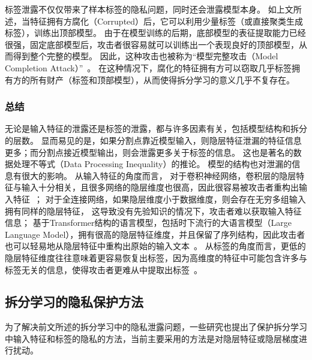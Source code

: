 标签泄露不仅仅带来了样本标签的隐私问题，同时还会泄露模型本身。
%
如上文所述，当特征拥有方腐化（Corrupted）后，它可以利用少量标签（或直接聚类生成标签），训练出顶部模型。
%
由于在模型训练的后期，底部模型的表征提取能力已经很强，固定底部模型后，攻击者很容易就可以训练出一个表现良好的顶部模型，从而得到整个完整的模型。
%
因此，这种攻击也被称为``模型完整攻击（Model Completion Attack）''~\cite{fucong2022label_infer_attack}。
%
在这种情况下，腐化的特征拥有方可以窃取几乎标签拥有方的所有财产（标签和顶部模型），从而使得拆分学习的意义几乎不复存在。


\subsubsection{总结}

无论是输入特征的泄露还是标签的泄露，都与许多因素有关，包括模型结构和拆分的层数。
%
显而易见的是，如果分割点靠近模型输入，则隐层特征泄漏的特征信息更多；而分割点接近模型输出，则会泄露更多关于标签的信息。
%
这也是著名的数据处理不等式（Data Processing Inequality）的推论。
%
模型的结构也对泄漏的信息有很大的影响。
%
从输入特征的角度而言，
%
对于卷积神经网络，卷积层的隐层特征与输入十分相关，且很多网络的隐层维度也很高，因此很容易被攻击者重构出输入特征~\cite{abuadbba2020can_split}；
%
对于全连接网络，如果隐层维度小于数据维度，则会存在无穷多组输入拥有同样的隐层特征，
这导致没有先验知识的情况下，攻击者难以获取输入特征信息；
%
基于Transformer结构的语言模型，包括时下流行的大语言模型（Large Language Model），拥有很高的隐层特征维度，并且保留了序列结构，因此攻击者也可以轻易地从隐层特征中重构出原始的输入文本~\cite{morris2023embedding_almost}。
%
从标签的角度而言，更低的隐层特征维度往往意味着更容易恢复出标签，因为高维度的特征中可能包含许多与标签无关的信息，使得攻击者更难从中提取出标签~\cite{oscarli2022label_defense_marvell,sunjiankai2022forward_embedding_protect}。


\subsection{拆分学习的隐私保护方法}
为了解决前文所述的拆分学习中的隐私泄露问题，一些研究也提出了保护拆分学习中输入特征和标签的隐私的方法，当前主要采用的方法是对隐层特征或隐层梯度进行扰动。


